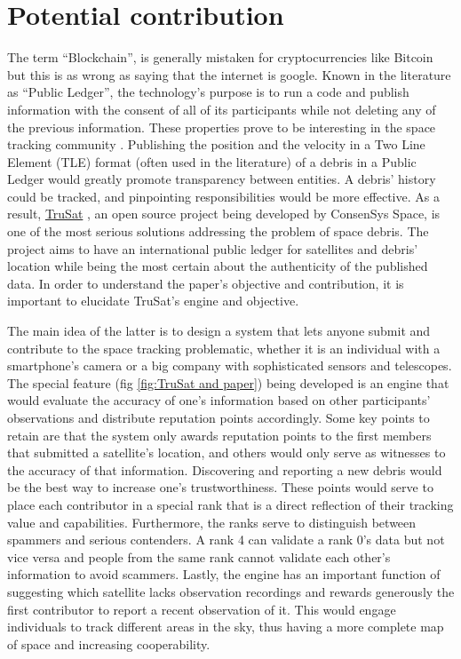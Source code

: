\documentclass[conference]{IEEEtran}
\begin{document}
\section{Potential contribution}
The term ``Blockchain'', is generally mistaken for cryptocurrencies like Bitcoin but this is as wrong as saying that the internet is google. Known in the literature as ``Public Ledger'', the technology's purpose is to run a code and publish information with the consent of all of its participants while not deleting any of the previous information. These properties prove to be interesting in the space tracking community \cite{BlockchainSpaceObjectLocation}. Publishing the position and the velocity in a Two Line Element (TLE) \cite{TwoLineSystem} format (often used in the literature) of a debris in a Public Ledger would greatly promote transparency between entities. A debris' history could be tracked, and pinpointing responsibilities would be more effective. As a result, \href{www.trusat.org}{TruSat} \cite{TruSat}, an open source project being developed by ConsenSys Space, is one of the most serious solutions addressing the problem of space debris. The project aims to have an international public ledger for satellites and debris' location while being the most certain about the authenticity of the published data. In order to understand the paper's objective and contribution, it is important to elucidate TruSat's engine and objective. 

The main idea of the latter is to design a system that lets anyone submit and contribute to the space tracking problematic, whether it is an individual with a smartphone's camera or a big company with sophisticated sensors and telescopes. The special feature (fig \ref{fig:TruSat and paper}) being developed is an engine that would evaluate the accuracy of one's information based on other participants' observations and distribute reputation points accordingly. Some key points to retain are that the system only awards reputation points to the first members that submitted a satellite's location, and others would only serve as witnesses to the accuracy of that information. Discovering and reporting a new debris would be the best way to increase one's trustworthiness. These points would serve to place each contributor in a special rank that is a direct reflection of their tracking value and capabilities. Furthermore, the ranks serve to distinguish between spammers and serious contenders. A rank 4 can validate a rank 0's data but not vice versa and people from the same rank cannot validate each other's information to avoid scammers. Lastly, the engine has an important function of suggesting which satellite lacks observation recordings and rewards generously the first contributor to report a recent observation of it. This would engage individuals to track different areas in the sky, thus having a more complete map of space and increasing cooperability. 
\end{document}
